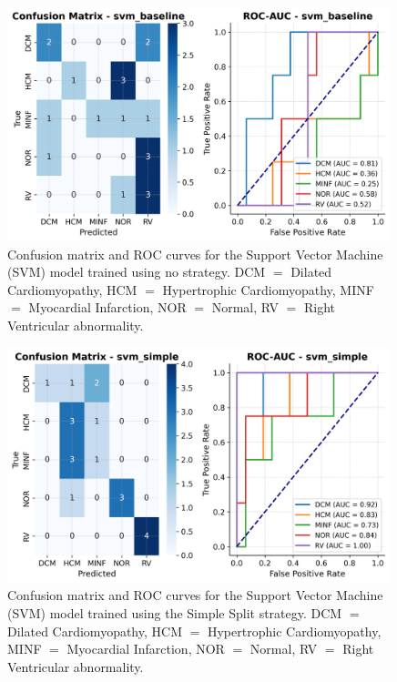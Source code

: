 \begin{figure}
	\begin{center}
		\includegraphics[width=0.99\textwidth]{../images/metrics/svm/svm_baseline_metrics.png}
	\end{center}
	\caption{Confusion matrix and ROC curves for the Support Vector Machine (SVM)
		model trained using no strategy. DCM $=$ Dilated Cardiomyopathy, HCM $=$
		Hypertrophic Cardiomyopathy, MINF $=$ Myocardial Infarction, NOR $=$ Normal, RV
		$=$ Right Ventricular abnormality.}
\end{figure}

\begin{figure}
	\begin{center}
		\includegraphics[width=0.99\textwidth]{../images/metrics/svm/svm_simple_metrics.png}
	\end{center}
	\caption{Confusion matrix and ROC curves for the Support Vector Machine (SVM)
		model trained using the Simple Split strategy. DCM $=$ Dilated
		Cardiomyopathy, HCM $=$ Hypertrophic Cardiomyopathy, MINF $=$ Myocardial
		Infarction, NOR $=$ Normal, RV $=$ Right Ventricular abnormality.}
\end{figure}

